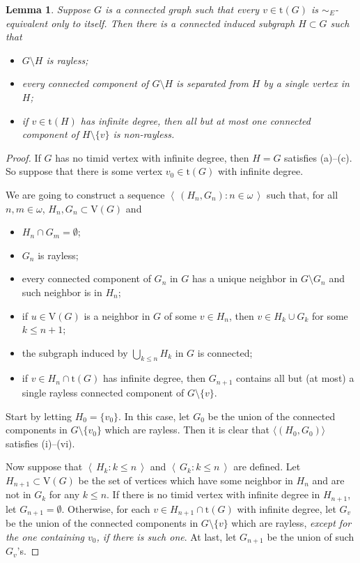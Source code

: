 \documentclass[10pt]{article}
\numberwithin{equation}{subsection}
\newtheorem{lemma}[equation]{Lemma}
\theoremstyle{remark}
\newcommand{\seq}[1]{{\left\langle \, {#1} \,\right\rangle}}
\begin{document}
\begin{lemma}\label{LEMMA_DenseHConstruction}
    Suppose $G$ is a connected graph such that every $v\in \mathrm{t}(G)$ is $\sim_E$-equivalent only to itself. Then there is a connected induced subgraph $H\subset G$ such that
    \begin{itemize}
        \item[(a)] $G\setminus H$ is rayless;
        \item[(b)] every connected component of $G\setminus H$ is separated from $H$ by a single vertex in $H$;
        \item[(c)] if $v\in \mathrm{t}(H)$ has infinite degree, then all but at most one connected component of $H\setminus \{v\}$ is non-rayless.
    \end{itemize}
\end{lemma}
\begin{proof}
    If $G$ has no timid vertex with infinite degree, then $H=G$ satisfies (a)--(c). So suppose that there is some vertex $v_0\in \mathrm{t}(G)$ with infinite degree. 
    
    We are going to construct a sequence $\seq{(H_n,G_n):n\in\omega}$ such that, for all $n,m\in\omega$, $H_n,G_n\subset\mathrm{V}(G)$ and
    \begin{itemize}
        \item[(i)] $H_n\cap G_m=\emptyset$;
        \item[(ii)] $G_n$ is rayless;
        \item[(iii)] every connected component of $G_n$ in $G$ has a unique neighbor in $G\setminus G_n$ and such neighbor is in $H_n$;
        \item[(iv)] if $u\in \mathrm{V}(G)$ is a neighbor in $G$ of some $v\in H_n$, then $v\in H_k\cup G_k$ for some $k\le n+1$;
        \item[(v)] the subgraph induced by $\bigcup_{k\le n}H_k$ in $G$ is connected;
        \item[(vi)] if $v\in H_n\cap \mathrm{t}(G)$ has infinite degree, then $G_{n+1}$ contains all but (at most) a single rayless connected component of $G\setminus\{v\}$.
    \end{itemize}

    Start by letting $H_0 = \{v_0\}$. In this case, let $G_0$ be the union of the connected components in $G\setminus \{v_0\}$ which are rayless. Then it is clear that $\langle (H_0,G_0)\rangle$ satisfies (i)--(vi). 

    Now suppose that $\seq{H_k:k\le n}$ and $\seq{G_k:k\le n}$ are defined. Let $H_{n+1}\subset \mathrm{V}(G)$ be the set of vertices which have some neighbor in $H_n$ and are not in $G_k$ for any $k\le n$. If there is no timid vertex with infinite degree in $H_{n+1}$, let $G_{n+1} = \emptyset$. Otherwise, for each $v\in H_{n+1}\cap \mathrm{t}(G)$ with infinite degree, let $G_{v}$ be the union of the connected components in $G\setminus \{v\}$ which are rayless, \emph{except for the one containing $v_0$, if there is such one}. At last, let $G_{n+1}$ be the union of such $G_v$'s.


\end{proof}
\end{document}
